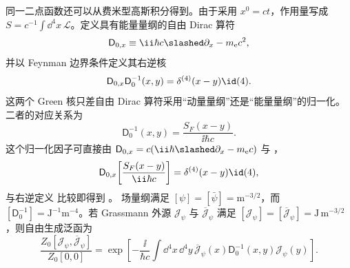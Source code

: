 同一二点函数还可以从费米型高斯积分得到。由于采用 $x^0=ct$，作用量写成 $S=c^{-1}\int\dd^4 x\,\mathcal L$。定义具有能量量纲的自由 Dirac 算符
\begin{equation}
 \mathsf D_{0,x}\equiv\ii\hbar c\slashed\partial_x-m_{\mathrm e} c^2,
 \label{eq:dirac-energy-kernel-dp42}
\end{equation}
并以 Feynman 边界条件定义其右逆核
\begin{equation}
 \mathsf D_{0,x}\mathsf D_0^{-1}(x,y)
 =\delta^{(4)}(x-y)\id(4).
 \label{eq:dirac-energy-kernel-inverse-def-dp42}
\end{equation}
这两个 Green 核只差自由 Dirac 算符采用“动量量纲”还是“能量量纲”的归一化。二者的对应关系为
\begin{equation}
 \boxed{
 \mathsf D_0^{-1}(x,y)
 =\frac{S_F(x-y)}{\ii\hbar c}.}
 \label{eq:dirac-kernel-propagator-relation-dp42}
\end{equation}
这个归一化因子可直接由
$\mathsf D_{0,x}=c(\ii\hbar\slashed\partial_x-m_{\mathrm e} c)$ 与
，
\begin{equation*}
 \mathsf D_{0,x}\!\left[\frac{S_F(x-y)}{\ii\hbar c}\right]
 =\delta^{(4)}(x-y)\id(4),
\end{equation*}
与右逆定义 比较即得到
。
场量纲满足 $[\psi]=[\bar\psi]=\mathrm{m^{-3/2}}$，而 $[\mathsf D_0^{-1}]=\mathrm{J^{-1}m^{-4}}$。若 Grassmann 外源 $\mathcal J_\psi$ 与 $\overline{\mathcal J}_\psi$ 满足 $[\mathcal J_\psi]=[\overline{\mathcal J}_\psi]=\mathrm{J\,m^{-3/2}}$，则自由生成泛函为
\begin{equation}
 \boxed{
 \frac{Z_0[\mathcal J_\psi,\overline{\mathcal J}_\psi]}{Z_0[0,0]}
 =\exp\!\left[
 -\frac{\ii}{\hbar c}
 \int\dd^4 x\,\dd^4 y\,
 \overline{\mathcal J}_\psi(x)\mathsf D_0^{-1}(x,y)\mathcal J_\psi(y)
 \right].}
 \label{eq:dirac-free-generating-functional-dp42}
\end{equation}

